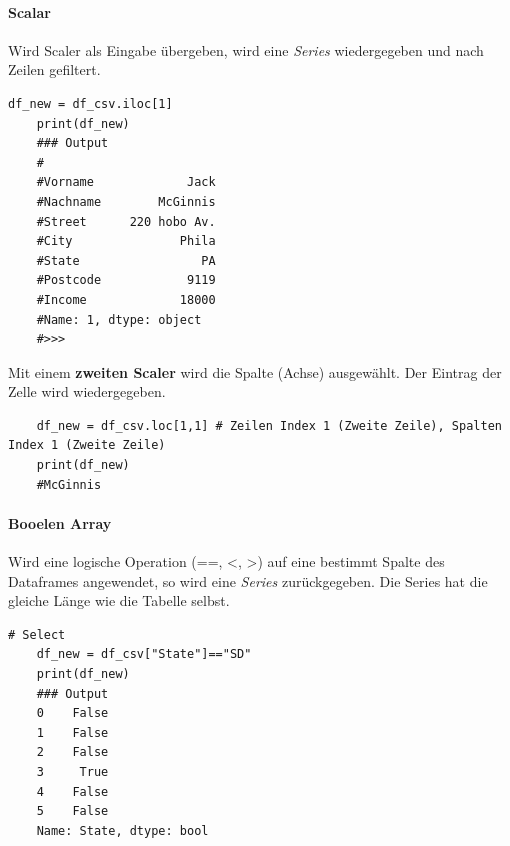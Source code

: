 \paragraph*{Scalar}
Wird Scaler als Eingabe übergeben, wird eine \textit{Series} wiedergegeben und nach Zeilen gefiltert.
\begin{lstlisting}[style=python]
	df_new = df_csv.iloc[1]
	print(df_new)
	### Output
	#
	#Vorname             Jack
	#Nachname        McGinnis
	#Street      220 hobo Av.
	#City               Phila
	#State                 PA
	#Postcode            9119
	#Income             18000
	#Name: 1, dtype: object
	#>>> 
\end{lstlisting}
Mit einem \textbf{zweiten Scaler} wird die Spalte (Achse) ausgewählt. Der Eintrag der Zelle wird wiedergegeben.
\begin{lstlisting}
	df_new = df_csv.loc[1,1] # Zeilen Index 1 (Zweite Zeile), Spalten Index 1 (Zweite Zeile)
	print(df_new)
	#McGinnis
\end{lstlisting}

\paragraph*{Booelen Array}
Wird eine logische Operation (==, <, >) auf eine bestimmt Spalte des Dataframes angewendet, so wird eine \textit{Series} zurückgegeben. Die Series hat die gleiche Länge wie die Tabelle selbst. 
\begin{lstlisting}[style=python]
	# Select 
	df_new = df_csv["State"]=="SD"
	print(df_new)
	### Output
	0    False
	1    False
	2    False
	3     True
	4    False
	5    False
	Name: State, dtype: bool
\end{lstlisting}

